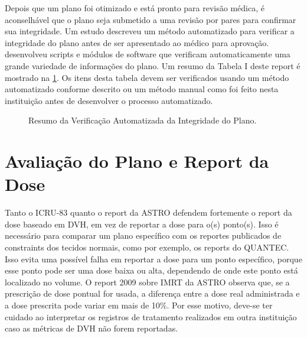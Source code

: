 \documentclass[11pt,a4paper]{article}
\newcounter{exemplo}
\begin{document}
	Depois que um plano foi otimizado e está pronto para revisão médica, é aconselhável que o plano seja submetido a uma revisão por pares para confirmar sua integridade. Um estudo descreveu um método automatizado para verificar a integridade do plano antes de ser apresentado ao médico para aprovação. \citet{yang2012automated} desenvolveu scripts e módulos de software que verificam automaticamente uma grande variedade de informações do plano. Um resumo da Tabela I deste report é mostrado na \ref{fig:checkPlanoAutomatizado}. Os itens desta tabela devem ser verificados usando um método automatizado conforme descrito ou um método manual como foi feito nesta instituição antes de desenvolver o processo automatizado.

	\begin{figure}[h]
		\centering
		\caption{Resumo da Verificação Automatizada da Integridade do Plano.}
		\label{fig:checkPlanoAutomatizado}
	\end{figure}

\section{Avaliação do Plano e Report da Dose}

	Tanto o ICRU-83 quanto o report da ASTRO defendem fortemente o report da dose baseado em DVH, em vez de reportar a dose para o(s) ponto(s). Isso é necessário para comparar um plano específico com os reportes publicados de constraints dos tecidos normais, como por exemplo, os reports do QUANTEC. Isso evita uma possível falha em reportar a dose para um ponto específico, porque esse ponto pode ser uma dose baixa ou alta, dependendo de onde este ponto está localizado no volume. O report 2009 sobre IMRT da ASTRO observa que, se a prescrição de dose pontual for usada, a diferença entre a dose real administrada e a dose prescrita pode variar em mais de 10\%. Por esse motivo, deve-se ter cuidado ao interpretar os registros de tratamento realizados em outra instituição caso as métricas de DVH não forem reportadas.
\end{document}
